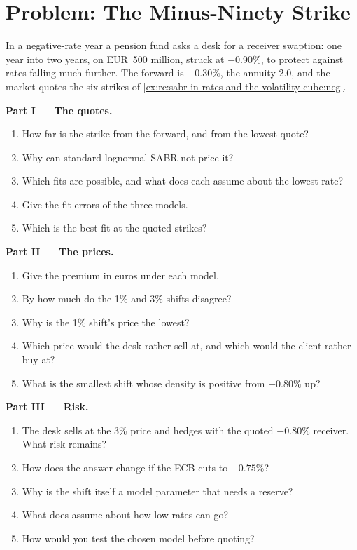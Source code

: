 \section{Problem: The Minus-Ninety Strike}

\begin{problem}\label{pb:rc:sabr-in-rates-and-the-volatility-cube:1}
In a negative-rate year a pension fund asks a desk for a receiver swaption:
one year into two years, on EUR~500 million, struck at $-0.90\%$, to protect
against rates falling much further. The forward is $-0.30\%$, the annuity
2.0, and the market quotes the six strikes of
\cref{ex:rc:sabr-in-rates-and-the-volatility-cube:neg}.

\medskip\noindent\textbf{Part I --- The quotes.}
\begin{enumerate}
\item How far is the strike from the forward, and from the lowest quote?
\item Why can standard lognormal SABR not price it?
\item Which fits are possible, and what does each assume about the lowest rate?
\item Give the fit errors of the three models.
\item Which is the best fit at the quoted strikes?
\end{enumerate}

\medskip\noindent\textbf{Part II --- The prices.}
\begin{enumerate}[resume]
\item Give the premium in euros under each model.
\item By how much do the 1\% and 3\% shifts disagree?
\item Why is the 1\% shift's price the lowest?
\item Which price would the desk rather sell at, and which would the client
rather buy at?
\item What is the smallest shift whose density is positive from $-0.80\%$ up?
\end{enumerate}

\medskip\noindent\textbf{Part III --- Risk.}
\begin{enumerate}[resume]
\item The desk sells at the 3\% price and hedges with the quoted $-0.80\%$
receiver. What risk remains?
\item How does the answer change if the ECB cuts to $-0.75\%$?
\item Why is the shift itself a model parameter that needs a reserve?
\item What does  assume about how low rates can go?
\item How would you test the chosen model before quoting?
\end{enumerate}


\end{problem}
